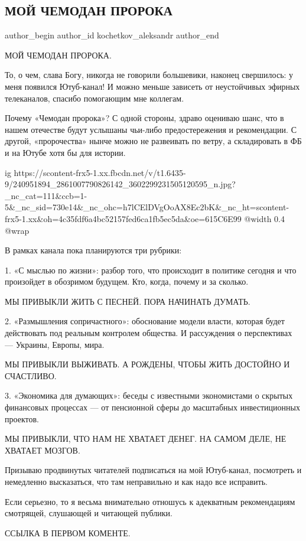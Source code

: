  
 
 
 
 
 
\subsection{МОЙ ЧЕМОДАН ПРОРОКА}
\label{sec:01_09_2021.fb.kochetkov_aleksandr.1.chemodan_proroka}
 
\ifcmt
 author_begin
   author_id kochetkov_aleksandr
 author_end
\fi

МОЙ ЧЕМОДАН ПРОРОКА.

То, о чем, слава Богу, никогда не говорили большевики, наконец свершилось: у
меня появился Ютуб-канал! И можно меньше зависеть от неустойчивых эфирных
телеканалов, спасибо помогающим мне коллегам.

Почему «Чемодан пророка»? С одной стороны, здраво оцениваю шанс, что в нашем
отечестве будут услышаны чьи-либо предостережения и рекомендации. С другой,
«пророчества» нынче можно не развеивать по ветру, а складировать в ФБ и на
Ютубе хотя бы для истории.

\ifcmt
  ig https://scontent-frx5-1.xx.fbcdn.net/v/t1.6435-9/240951894_2861007790826142_3602299231505120595_n.jpg?_nc_cat=111&ccb=1-5&_nc_sid=730e14&_nc_ohc=h7lCElDVgOoAX8Ec2bK&_nc_ht=scontent-frx5-1.xx&oh=4c35fdf6a4bc52157fed6ca1fb5ec5da&oe=615C6E99
  @width 0.4
	@wrap \parpic[r]
\fi

В рамках канала пока планируются три рубрики: 

1. «С мыслью по жизни»: разбор того, что происходит в политике сегодня и что
произойдет в обозримом будущем. Кто, когда, почему и за сколько.

МЫ ПРИВЫКЛИ ЖИТЬ С ПЕСНЕЙ. ПОРА НАЧИНАТЬ ДУМАТЬ.

2. «Размышления сопричастного»: обоснование модели власти, которая будет
действовать под реальным контролем общества. И рассуждения о перспективах —
Украины, Европы, мира.

МЫ ПРИВЫКЛИ ВЫЖИВАТЬ. А РОЖДЕНЫ, ЧТОБЫ ЖИТЬ ДОСТОЙНО И СЧАСТЛИВО.

3. «Экономика для думающих»: беседы с известными экономистами о скрытых
финансовых процессах — от пенсионной сферы до масштабных инвестиционных
проектов.

МЫ ПРИВЫКЛИ, ЧТО НАМ НЕ ХВАТАЕТ ДЕНЕГ. НА САМОМ ДЕЛЕ, НЕ ХВАТАЕТ МОЗГОВ.

Призываю продвинутых читателей подписаться на мой Ютуб-канал, посмотреть и
немедленно высказаться, что там неправильно и как надо все исправить. 

Если серьезно, то я весьма внимательно отношусь к адекватным рекомендациям
смотрящей, слушающей и читающей публики. 

ССЫЛКА В ПЕРВОМ КОМЕНТЕ.
